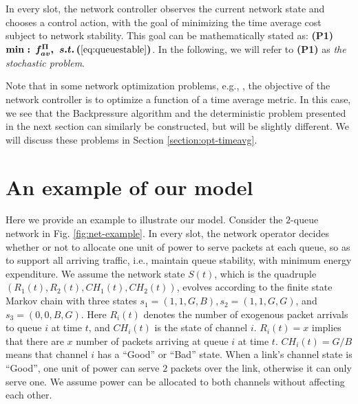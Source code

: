 \documentclass[journal]{IEEEtran}
\newcommand{\bv}[1]{{\boldsymbol{#1} }}
\begin{document}
In every slot, the network controller observes the current network state and chooses a control action, with the goal of minimizing the time average cost subject to network stability. This goal can be mathematically stated as:
\textbf{(P1)}\,\,\, $\bv{\min: \,  f^{\Pi}_{av}, \,\, s.t.\,  (\ref{eq:queuestable})}$. 
In the following, we will refer to \textbf{(P1)} as \emph{the stochastic problem}. 

Note that in some network optimization problems, e.g., \cite{neelyfairness}, the objective of the network controller is to optimize a function of a time average metric. In this case, we see that the Backpressure algorithm and the deterministic problem presented in the next section can similarly be constructed, but will be slightly different. 
We will discuss these problems in Section \ref{section:opt-timeavg}. 

\vspace{-.1in}
\section{An example of our model}\label{section:example}
Here we provide an example to illustrate our model. Consider the $2$-queue network in Fig. \ref{fig:net-example}. In every slot, the network operator decides whether or not to allocate one unit of power to serve packets at each queue, so as to support all arriving traffic, i.e., maintain queue stability, with minimum energy expenditure. 
We assume the network state $S(t)$, which is the quadruple $(R_1(t), R_2(t), CH_1(t), CH_2(t))$, evolves according to the finite state Markov chain with three states $s_1=(1, 1, G, B), s_2=(1, 1, G, G)$, and $s_3=(0, 0, B, G)$. Here $R_i(t)$ denotes the number of exogenous packet arrivals to queue $i$ at time $t$, and $CH_i(t)$ is the state of channel $i$. $R_i(t)=x$ implies that there are $x$ number of packets arriving at queue $i$ at time $t$. $CH_i(t)=G/B$ means that channel $i$ has a ``Good'' or ``Bad'' state. When a link's  channel state is ``Good'', one unit of power can serve $2$ packets over the link, otherwise it can only serve one. We assume power can be allocated to both channels without affecting each other. 
\end{document}
